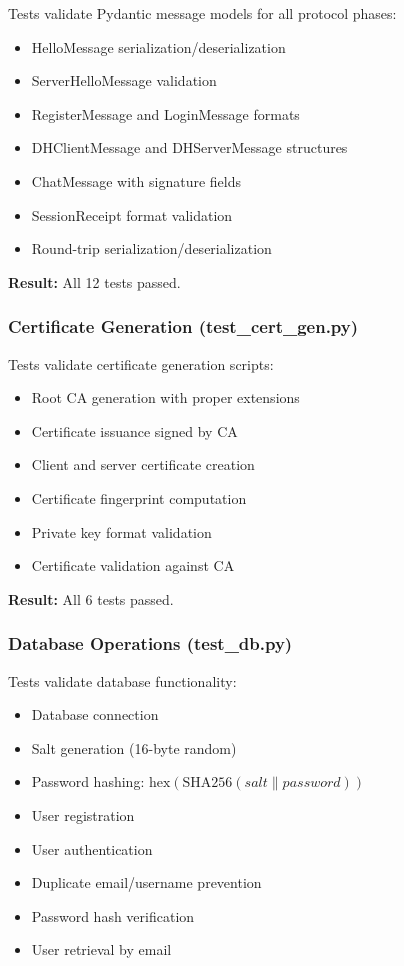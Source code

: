 \documentclass[runningheads]{llncs}
\begin{document}
Tests validate Pydantic message models for all protocol phases:
\begin{itemize}
    \item HelloMessage serialization/deserialization
    \item ServerHelloMessage validation
    \item RegisterMessage and LoginMessage formats
    \item DHClientMessage and DHServerMessage structures
    \item ChatMessage with signature fields
    \item SessionReceipt format validation
    \item Round-trip serialization/deserialization
\end{itemize}

\textbf{Result:} All 12 tests passed.

\subsubsection{Certificate Generation (test\_cert\_gen.py)}

Tests validate certificate generation scripts:
\begin{itemize}
    \item Root CA generation with proper extensions
    \item Certificate issuance signed by CA
    \item Client and server certificate creation
    \item Certificate fingerprint computation
    \item Private key format validation
    \item Certificate validation against CA
\end{itemize}

\textbf{Result:} All 6 tests passed.

\subsubsection{Database Operations (test\_db.py)}

Tests validate database functionality:
\begin{itemize}
    \item Database connection
    \item Salt generation (16-byte random)
    \item Password hashing: $\text{hex}(\text{SHA256}(salt \| password))$
    \item User registration
    \item User authentication
    \item Duplicate email/username prevention
    \item Password hash verification
    \item User retrieval by email
\end{itemize}
\end{document}
